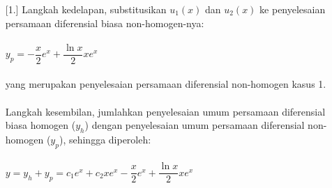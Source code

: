 \begin{enumerate} [1.]
	Langkah kedelapan, substitusikan \begin{math} u_1 (x) \end{math} dan \begin{math} u_2 (x) \end{math} ke penyelesaian persamaan diferensial biasa non-homogen-nya: \\ \\
	\begin{math} y_p = -\dfrac{x}{2} e^{x} + \dfrac{\ln x}{2} xe^{x} \end{math} \\ \\
	yang merupakan penyelesaian persamaan diferensial non-homogen kasus 1. \\ \\
	Langkah kesembilan, jumlahkan penyelesaian umum persamaan diferensial biasa homogen (\begin{math} y_h \end{math}) dengan penyelesaian umum persamaan diferensial non-homogen (\begin{math} y_p \end{math}), sehingga diperoleh: \\ \\
	\begin{math} y = y_h + y_p =   c_1 e^{x} + c_2 xe^{x} - \dfrac{x}{2} e^{x} + \dfrac{\ln x}{2} xe^{x} \end{math}


\end{enumerate}
